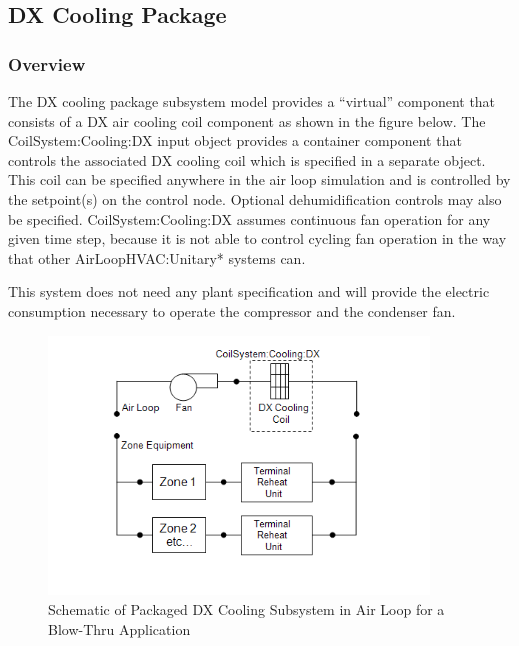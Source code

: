 \subsection{DX Cooling Package}\label{dx-cooling-package}

\subsubsection{Overview}\label{overview-5}

The DX cooling package subsystem model provides a ``virtual'' component that consists of a DX air cooling coil component as shown in the figure below. The CoilSystem:Cooling:DX input object provides a container component that controls the associated DX cooling coil which is specified in a separate object. This coil can be specified anywhere in the air loop simulation and is controlled by the setpoint(s) on the control node. Optional dehumidification controls may also be specified. CoilSystem:Cooling:DX assumes continuous fan operation for any given time step, because it is not able to control cycling fan operation in the way that other AirLoopHVAC:Unitary* systems can.

This system does not need any plant specification and will provide the electric consumption necessary to operate the compressor and the condenser fan.

\begin{figure}[hbtp] %
\centering
\includegraphics[width=0.9\textwidth, height=0.9\textheight, keepaspectratio=true]{media/image5198.png}
\caption{  Schematic of Packaged DX Cooling Subsystem in Air Loop for a Blow-Thru Application \protect \label{fig:schematic-of-packaged-dx-cooling-subsystem-in}}
\end{figure}

